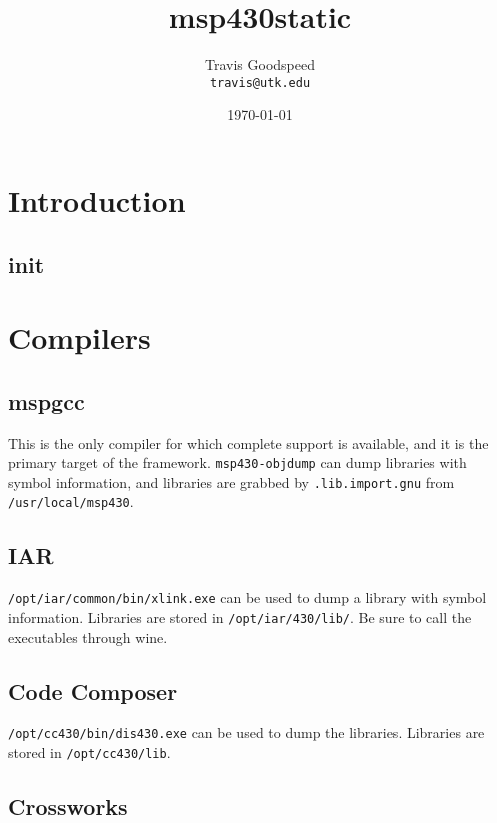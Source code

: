 \documentclass[]{book}
\title{msp430static}
\author{Travis Goodspeed\\{\tt travis@utk.edu}}
\date{\today}
\begin{document}
\maketitle

\chapter{Introduction}

\section{init}


\chapter{Compilers}

\section{mspgcc}

This is the only compiler for which complete support is available,
and it is the primary target of the framework.  {\tt msp430-objdump}
can dump libraries with symbol information, and libraries are grabbed
by {\tt .lib.import.gnu} from {\tt /usr/local/msp430}.

\section{IAR}


{\tt /opt/iar/common/bin/xlink.exe} can be used to dump a library with symbol information.
Libraries are stored in {\tt /opt/iar/430/lib/}.  Be sure to call the
executables through wine.

\section{Code Composer}


{\tt /opt/cc430/bin/dis430.exe} can be used to dump the libraries.
Libraries are stored in {\tt /opt/cc430/lib}.

\section{Crossworks}

\end{document}
